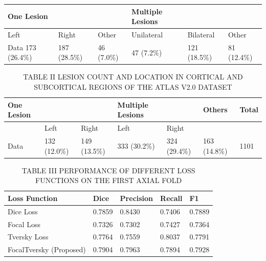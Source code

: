 \begin{table}[htbp]
\centering
\label{tab:table\_001}
\begin{tabular}{llllll}
\hline
One Lesion &  &  & Multiple Lesions &  &  \\
\hline
Left & Right & Other & Unilateral & Bilateral & Other \\
Data 173 (26.4\%) & 187 (28.5\%) & 46 (7.0\%) & 47 (7.2\%) & 121 (18.5\%) & 81 (12.4\%) \\
\hline
\end{tabular}
\end{table}

\begin{table}[htbp]
\centering
\caption{TABLE II LESION COUNT AND LOCATION IN CORTICAL AND SUBCORTICAL REGIONS OF THE ATLAS V2.0 DATASET}
\label{tab:table\_002}
\begin{tabular}{lllllll}
\hline
One Lesion &  &  & Multiple Lesions &  & Others & Total \\
\hline
 & Left & Right & Left & Right &  &  \\
Data & 132 (12.0\%) & 149 (13.5\%) & 333 (30.2\%) & 324 (29.4\%) & 163 (14.8\%) & 1101 \\
\hline
\end{tabular}
\end{table}

\begin{table}[htbp]
\centering
\caption{TABLE III PERFORMANCE OF DIFFERENT LOSS FUNCTIONS ON THE FIRST AXIAL FOLD}
\label{tab:table\_003}
\begin{tabular}{lllll}
\hline
Loss Function & Dice & Precision & Recall & F1 \\
\hline
Dice Loss & 0.7859 & 0.8430 & 0.7406 & 0.7889 \\
Focal Loss & 0.7326 & 0.7302 & 0.7427 & 0.7364 \\
Tversky Loss & 0.7764 & 0.7559 & 0.8037 & 0.7791 \\
FocalTversky (Proposed) & 0.7904 & 0.7963 & 0.7894 & 0.7928 \\
\hline
\end{tabular}
\end{table}

